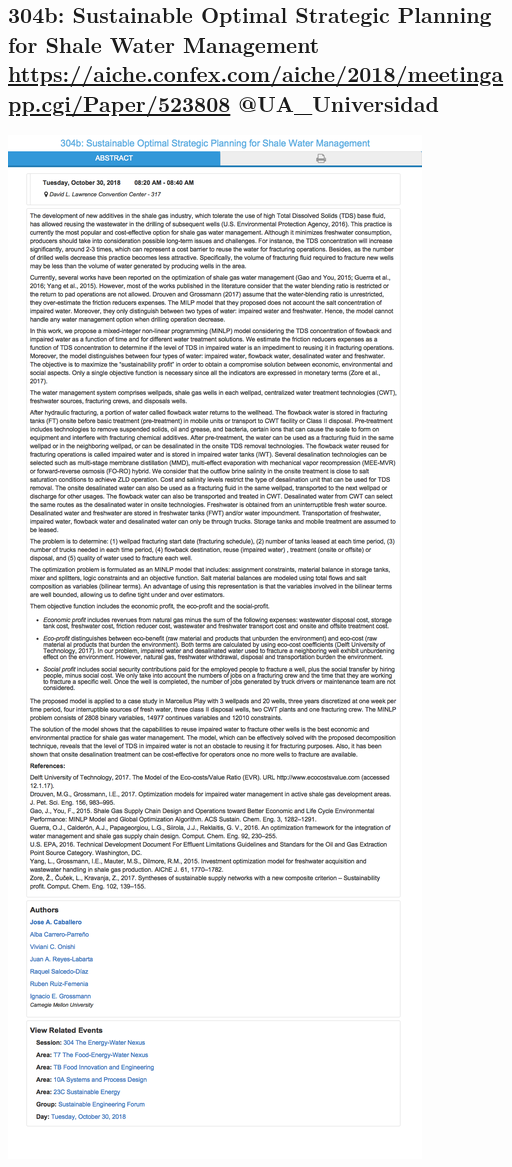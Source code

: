 \documentclass[11pt]{article}
\begin{document}
\subsection{304b: Sustainable Optimal Strategic Planning for Shale Water Management \url{https://aiche.confex.com/aiche/2018/meetingapp.cgi/Paper/523808} @UA\_Universidad}
\label{sec:orgcd403db}
\begin{center}
\includegraphics[width=.9\linewidth]{./523808.png}
\end{center}
\end{document}
